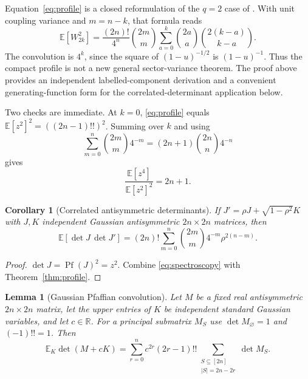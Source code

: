 \documentclass[11pt,a4paper]{article}
\newtheorem{lemma}[theorem]{Lemma}
\newtheorem{corollary}[theorem]{Corollary}
\theoremstyle{definition}
\theoremstyle{remark}
\newcommand{\E}{\mathbb{E}}
\newcommand{\R}{\mathbb{R}}
\begin{document}
Equation~\eqref{eq:profile} is a closed reformulation of the $q=2$ case of
\citet[Eq.~(47)]{Mukhametzhanov2022}.  With unit coupling variance and $m=n-k$,
that formula reads
\[
 \E[W_{2k}^2]
 =\frac{(2n)!}{4^n}\binom{2m}{m}
   \sum_{a=0}^{k}\binom{2a}{a}\binom{2(k-a)}{k-a}.
\]
The convolution is $4^k$, since the square of $(1-u)^{-1/2}$ is $(1-u)^{-1}$.
Thus the compact profile is not a new general sector-variance theorem.  The proof above
provides an independent labelled-component derivation and a convenient generating-function
form for the correlated-determinant application below.

Two checks are immediate.  At $k=0$, \eqref{eq:profile} equals
$\E[z^2]^2=((2n-1)!!)^2$.  Summing over $k$ and using
\begin{equation}
 \sum_{m=0}^{n}\binom{2m}{m}4^{-m}
 =(2n+1)\binom{2n}{n}4^{-n}
\end{equation}
gives
\begin{equation}
 \frac{\E[z^4]}{\E[z^2]^2}=2n+1.
 \label{eq:fourthq2}
\end{equation}

\begin{corollary}[Correlated antisymmetric determinants]\label{cor:det}
If $J'=\rho J+\sqrt{1-\rho^2}K$ with $J,K$ independent Gaussian antisymmetric
$2n\times2n$ matrices, then
\begin{equation}
 \E[\det J\,\det J']
 =(2n)!\sum_{m=0}^{n}\binom{2m}{m}4^{-m}\rho^{2(n-m)}.
 \label{eq:det}
\end{equation}
\end{corollary}

\begin{proof}
$\det J=\operatorname{Pf}(J)^2=z^2$.  Combine \eqref{eq:spectroscopy} with
Theorem~\ref{thm:profile}.
\end{proof}

\begin{lemma}[Gaussian Pfaffian convolution]\label{lem:convolution}
Let $M$ be a fixed real antisymmetric $2n\times2n$ matrix, let the upper entries of $K$
be independent standard Gaussian variables, and let $c\in\R$.
For a principal submatrix $M_S$ use $\det M_\varnothing=1$ and $(-1)!!=1$.
Then
\begin{equation}
 \E_K\det(M+cK)=
 \sum_{r=0}^{n}c^{2r}(2r-1)!!
 \sum_{\substack{S\subseteq[2n]\\|S|=2n-2r}}\det M_S.
 \label{eq:convolution}
\end{equation}
\end{lemma}
\end{document}
